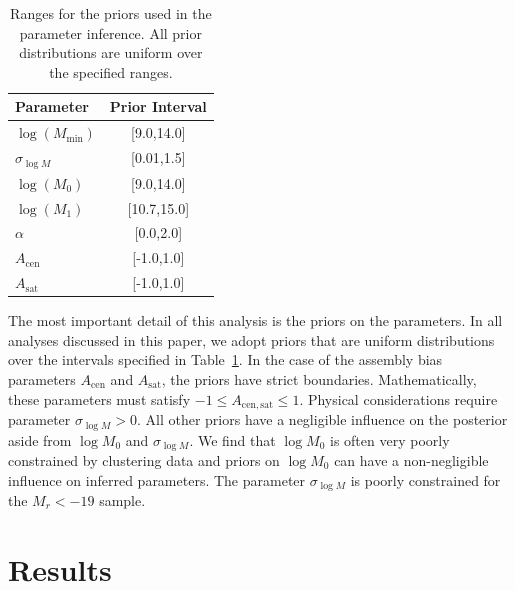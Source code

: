 \documentclass[usenatbib,usegraphicx,letterpaper]{mn2e}
\newcommand{\magr}{M_r}
\begin{document}
\begin{table}
\begin{center}
{\renewcommand{\arraystretch}{1.3}
\renewcommand{\tabcolsep}{0.2cm}
\begin{tabular}{l c}
\hline
\hline
Parameter & Prior Interval\\
\hline
$\log (M_{\mathrm{min}})$ & [9.0,14.0] \\
$\sigma_{\log M}$ & [0.01,1.5] \\
$\log (M_0)$ & [9.0,14.0]\\
$\log (M_1)$ & [10.7,15.0]\\
$\alpha$ & [0.0,2.0]\\
$A_{\mathrm{cen}}$ & [-1.0,1.0]\\
$A_{\mathrm{sat}}$ & [-1.0,1.0]\\
\hline
\end{tabular}
\medskip
\caption{
Ranges for the priors used in the parameter inference. All prior distributions are uniform over the
specified ranges.}
 }
 \label{table:priors}
 \end{center}
\end{table}


The most important detail of this analysis is the priors on the parameters. In all analyses
discussed in this paper, we adopt priors that are uniform distributions over the intervals
specified in Table~\ref{table:priors}. In the case of the assembly bias parameters
$A_{\mathrm{cen}}$ and $A_{\mathrm{sat}}$, the priors have strict
boundaries. Mathematically, these parameters must satisfy $-1 \le A_{\mathrm{cen,sat}} \le 1$.
Physical considerations require parameter $\sigma_{\log M} > 0$. All other
priors have a negligible influence on the posterior aside from $\log M_0$ and 
$\sigma_{\log M}$. We find that $\log M_0$ is often very poorly constrained by clustering data and
priors on $\log M_0$ can have a non-negligible influence on inferred parameters. The parameter 
$\sigma_{\log M}$ is poorly constrained for the $\magr < -19$ sample.


\section{Results}
\label{section:results}
\end{document}
